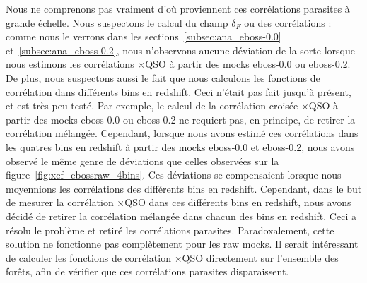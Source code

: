 Nous ne comprenons pas vraiment d'où proviennent ces corrélations parasites à grande échelle.
Nous suspectons le calcul du champ $\delta_F$ ou des corrélations : comme nous le verrons dans les sections~\ref{subsec:ana_eboss-0.0} et~\ref{subsec:ana_eboss-0.2}, nous n'observons aucune déviation de la sorte lorsque nous estimons les corrélations \lya{}$\times$QSO à partir des mocks eboss-0.0 ou eboss-0.2.
De plus, nous suspectons aussi le fait que nous calculons les fonctions de corrélation dans différents bins en redshift. Ceci n'était pas fait jusqu'à présent, et est très peu testé.
Par exemple, le calcul de la corrélation croisée \lya{}$\times$QSO à partir des mocks eboss-0.0 ou eboss-0.2 ne requiert pas, en principe, de retirer la corrélation mélangée. Cependant, lorsque nous avons estimé ces corrélations dans les quatres bins en redshift à partir des mocks eboss-0.0 et eboss-0.2, nous avons observé le même genre de déviations que celles observées sur la figure~\ref{fig:xcf_ebossraw_4bins}. Ces déviations se compensaient lorsque nous moyennions les corrélations des différents bins en redshift. Cependant, dans le but de mesurer la corrélation \lya{}$\times$QSO dans ces différents bins en redshift, nous avons décidé de retirer la corrélation mélangée dans chacun des bins en redshift. Ceci a résolu le problème et retiré les corrélations parasites.
Paradoxalement, cette solution ne fonctionne pas complètement pour les raw mocks. Il serait intéressant de calculer les fonctions de corrélation \lya{}$\times$QSO directement sur l'ensemble des forêts, afin de vérifier que ces corrélations parasites disparaissent.


